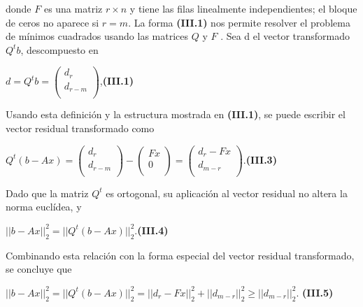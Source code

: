 \documentclass[twocolumn,twoside]{article}
\begin{document}
donde $F$ es una matriz $r\times n$ y tiene las filas linealmente independientes; el bloque de
ceros no aparece si $r = m$.
La forma \textbf{(III.1)} nos permite resolver el problema de m\'inimos cuadrados usando las
matrices $Q$ y $F$ . Sea d el vector transformado $Q^{t} b$, descompuesto en
\begin{center}
  $d = Q^t b = \left(\begin{array}{c}
    d_r\\ 
    d_{r-m}\\
   \end{array}\right)$,\hspace{1cm}\textbf{(III.1)}
\end{center}
Usando esta definici\'on y la estructura mostrada en \textbf{(III.1)}, se puede escribir el vector
residual transformado como

\begin{center}
  $Q^t(b - A x) = \left(\begin{array}{c}
    d_r\\ 
    d_{r-m}\\
   \end{array}\right)-
   \left(\begin{array}{c}
    Fx\\ 
    0\\
   \end{array}\right)=
   \left(\begin{array}{c}
    d_r-Fx\\ 
    d_{m-r}\\
   \end{array}\right)
   $.\hspace{3cm}\textbf{(III.3)}
\end{center}

Dado que la matriz $Q^{t}$ es ortogonal, su aplicaci\'on al vector residual no altera la norma
eucl\'idea, y
\begin{center}
  $||b - A x||_2^2 = ||Q^t (b - A x)||_2^2 $.\hspace{1.5cm}\textbf{(III.4)}
\end{center}

Combinando esta relaci\'on con la forma especial del vector residual transformado, se concluye que

\begin{center}
  $||b - A x||_2^2 = ||Q^t (b - A x)||_2^2 = ||d_r - F x||_2^2 + ||d_{m-r} ||_2^2 \geq ||d_{m-r} ||_2^2  $.
  \textbf{(III.5)}
\end{center}
\end{document}
